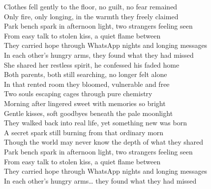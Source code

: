 \begin{lyrics}
Clothes fell gently to the floor, no guilt, no fear remained\\
Only fire, only longing, in the warmth they freely claimed\\

Park bench spark in afternoon light, two strangers feeling seen\\
From easy talk to stolen kiss, a quiet flame between\\
They carried hope through WhatsApp nights and longing messages\\
In each other’s hungry arms, they found what they had missed\\

She shared her restless spirit, he confessed his faded home\\
Both parents, both still searching, no longer felt alone\\
In that rented room they bloomed, vulnerable and free\\
Two souls escaping cages through pure chemistry\\

Morning after lingered sweet with memories so bright\\
Gentle kisses, soft goodbyes beneath the pale moonlight\\
They walked back into real life, yet something new was born\\
A secret spark still burning from that ordinary morn\\

Though the world may never know the depth of what they shared\\

Park bench spark in afternoon light, two strangers feeling seen\\
From easy talk to stolen kiss, a quiet flame between\\
They carried hope through WhatsApp nights and longing messages\\
In each other’s hungry arms… they found what they had missed

\end{lyrics}

